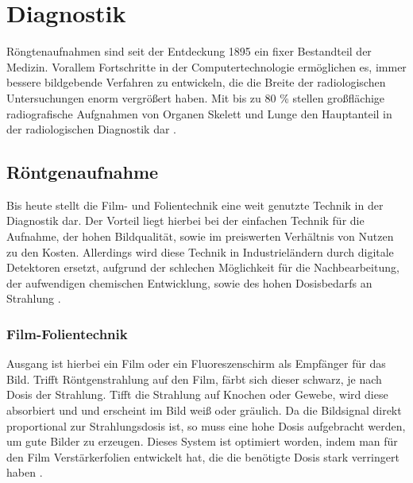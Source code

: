 \section{Diagnostik}
\label{sec:Diagnostik}
Röngtenaufnahmen sind seit der Entdeckung 1895 ein fixer Bestandteil der Medizin. Vorallem Fortschritte in der Computertechnologie
ermöglichen es, immer bessere bildgebende Verfahren zu entwickeln, die die Breite der radiologischen Untersuchungen enorm vergrößert
haben. Mit bis zu 80 \% stellen großflächige radiografische Aufgnahmen von Organen Skelett und Lunge den Hauptanteil in der radiologischen
Diagnostik dar \cite{MedizinischePhysik}.

\subsection{Röntgenaufnahme}
\label{sec:Röntgenaufnahme}
Bis heute stellt die Film- und Folientechnik eine weit genutzte Technik in der Diagnostik dar. Der Vorteil liegt hierbei
bei der einfachen Technik für die Aufnahme, der hohen Bildqualität, sowie im preiswerten Verhältnis von Nutzen zu den Kosten. Allerdings 
wird diese Technik in Industrieländern durch digitale Detektoren ersetzt, aufgrund der schlechen Möglichkeit für die Nachbearbeitung, 
der aufwendigen chemischen Entwicklung, sowie des hohen Dosisbedarfs an Strahlung \cite{MedizinischePhysik}.



\subsubsection{Film-Folientechnik}
\label{subsubsec:filmfolientechnik}
Ausgang ist hierbei ein Film oder ein Fluoreszenschirm als Empfänger für das Bild. Trifft Röntgenstrahlung auf den Film,
färbt sich dieser schwarz, je nach Dosis der Strahlung. Tifft die Strahlung auf Knochen oder Gewebe, wird diese absorbiert und 
und erscheint im Bild weiß oder gräulich. Da die Bildsignal direkt proportional zur Strahlungsdosis ist, so muss eine hohe Dosis 
aufgebracht werden, um gute Bilder zu erzeugen. Dieses System ist optimiert worden, indem man für den Film Verstärkerfolien entwickelt hat,
die die benötigte Dosis stark verringert haben \cite{Medizintechnik}. 

